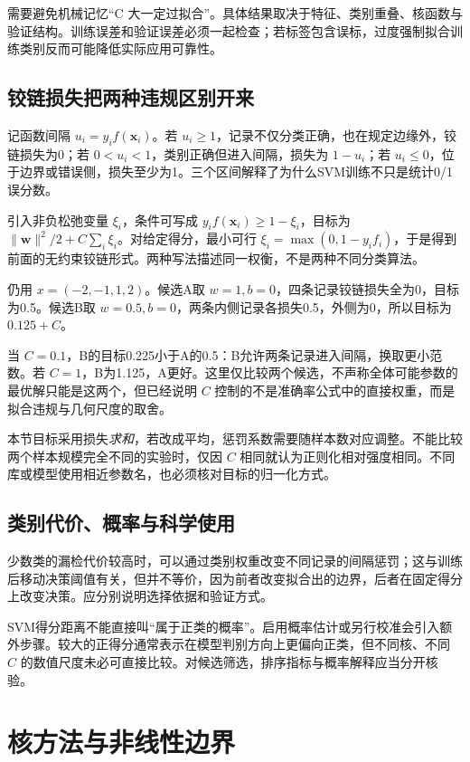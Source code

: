 需要避免机械记忆“C 大一定过拟合”。具体结果取决于特征、类别重叠、核函数与验证结构。训练误差和验证误差必须一起检查；若标签包含误标，过度强制拟合训练类别反而可能降低实际应用可靠性。

\subsection{铰链损失把两种违规区别开来}
记函数间隔 $u_i=y_if(\mathbf x_i)$。若 $u_i\geq1$，记录不仅分类正确，也在规定边缘外，铰链损失为0；若 $0<u_i<1$，类别正确但进入间隔，损失为 $1-u_i$；若 $u_i\leq0$，位于边界或错误侧，损失至少为1。三个区间解释了为什么SVM训练不只是统计0/1误分数。

引入非负松弛变量 $\xi_i$，条件可写成 $y_if(\mathbf x_i)\geq1-\xi_i$，目标为 $\|\mathbf w\|^2/2+C\sum_i\xi_i$。对给定得分，最小可行 $\xi_i=\max(0,1-y_if_i)$，于是得到前面的无约束铰链形式。两种写法描述同一权衡，不是两种不同分类算法。

仍用 $x=(-2,-1,1,2)$。候选A取 $w=1,b=0$，四条记录铰链损失全为0，目标为0.5。候选B取 $w=0.5,b=0$，两条内侧记录各损失0.5，外侧为0，所以目标为 $0.125+C$。

当 $C=0.1$，B的目标0.225小于A的0.5：B允许两条记录进入间隔，换取更小范数。若 $C=1$，B为1.125，A更好。这里仅比较两个候选，不声称全体可能参数的最优解只能是这两个，但已经说明 $C$ 控制的不是准确率公式中的直接权重，而是拟合违规与几何尺度的取舍。

本节目标采用损失\emph{求和}，若改成平均，惩罚系数需要随样本数对应调整。不能比较两个样本规模完全不同的实验时，仅因 $C$ 相同就认为正则化相对强度相同。不同库或模型使用相近参数名，也必须核对目标的归一化方式。

\subsection{类别代价、概率与科学使用}
少数类的漏检代价较高时，可以通过类别权重改变不同记录的间隔惩罚；这与训练后移动决策阈值有关，但并不等价，因为前者改变拟合出的边界，后者在固定得分上改变决策。应分别说明选择依据和验证方式。

SVM得分距离不能直接叫“属于正类的概率”。启用概率估计或另行校准会引入额外步骤。较大的正得分通常表示在模型判别方向上更偏向正类，但不同核、不同 $C$ 的数值尺度未必可直接比较。对候选筛选，排序指标与概率解释应当分开核验。

\section{核方法与非线性边界}

